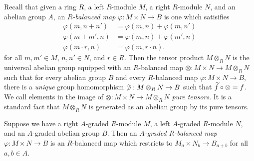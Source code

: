 \documentclass[../main.tex]{subfiles}
\begin{document}
Recall that given a ring $R$, a left $R$-module $M$, a right $R$-module $N$, and an abelian group $A$, an \emph{$R$-balanced map} $\varphi:M\times N\to B$ is one which satisifies
\begin{align*}
	\varphi(m,n+n')&=\varphi(m,n)+\varphi(m,n') \\
	\varphi(m+m',n)&=\varphi(m,n)+\varphi(m',n) \\
	\varphi(m\cdot r,n)&=\varphi(m,r\cdot n).
\end{align*}
for all $m,m'\in M$, $n,n'\in N$, and $r\in R$. Then the tensor product $M\otimes_RN$ is the universal abelian group equipped with an $R$-balanced map $\otimes:M\times N\to M\otimes_RN$ such that for every abelian group $B$ and every $R$-balanced map $\varphi:M\times N\to B$, there is a \emph{unique} group homomorphism $\widetilde\varphi:M\otimes_RN\to B$ such that $\widetilde f\circ\otimes=f$. We call elements in the image of $\otimes:M\times N\to M\otimes_RN$ \emph{pure tensors}. It is a standard fact that $M\otimes_RN$ is generated as an abelian group by its pure tensors.

\begin{definition}
	Suppose we have a right $A$-graded $R$-module $M$, a left $A$-graded $R$-module $N$, and an $A$-graded abelian group $B$. Then an \emph{$A$-graded $R$-balanced map} $\varphi:M\times N\to B$ is an $R$-balanced map which restricts to $M_a\times N_b\to B_{a+b}$ for all $a,b\in A$.
\end{definition}
\end{document}
